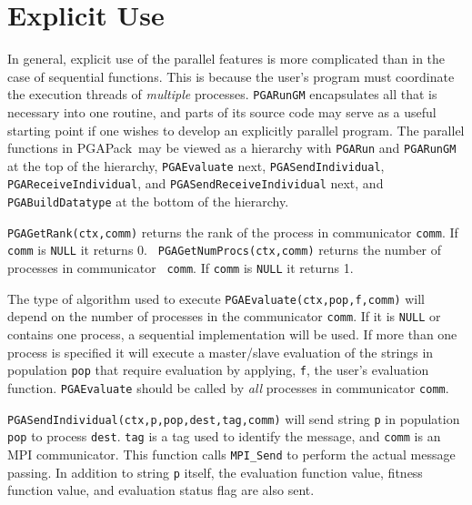 \documentclass{report}
\newcommand{\pga}{PGAPack}
\begin{document}
\section{Explicit Use}\label{sec:par-explicit-usage}

In general, explicit use of the parallel features is more complicated than in
the case of sequential functions.  This is because the user's program must
coordinate the execution threads of {\em multiple} processes.  {\tt PGARunGM}
encapsulates all that is necessary into one routine, and parts of its source
code may serve as a useful starting point if one wishes to develop an
explicitly parallel program.  The parallel functions in \pga\ may be viewed as
a hierarchy with {\tt PGARun} and {\tt PGARunGM} at the top of the hierarchy,
{\tt PGAEvaluate} next, {\tt PGASendIndividual}, {\tt PGAReceiveIndividual},
and {\tt PGASendReceiveIndividual} next, and {\tt PGABuildDatatype} at the
bottom of the hierarchy.

{\tt PGAGetRank(ctx,comm)} returns the rank of the process in communicator
{\tt comm}.  If {\tt comm} is {\tt NULL} it returns 0. {\tt
PGAGetNumProcs(ctx,comm)} returns the number of processes in communicator {\tt
comm}.  If {\tt comm} is {\tt NULL} it returns 1.

The type of algorithm used to execute {\tt PGAEvaluate(ctx,pop,f,comm)} will
depend on the number of processes in the communicator {\tt comm}.  If it is
{\tt NULL} or contains one process, a sequential implementation will be used.
If more than one process is specified it will execute a master/slave
evaluation of the strings in population {\tt pop} that require evaluation by
applying, {\tt f}, the user's evaluation function.  {\tt PGAEvaluate} should
be called by {\em all} processes in communicator {\tt comm}.

{\tt PGASendIndividual(ctx,p,pop,dest,tag,comm)} will send string {\tt p} in
population {\tt pop} to process {\tt dest}.  {\tt tag} is a tag used to
identify the message, and {\tt comm} is an MPI communicator. This function
calls {\tt MPI\_Send} to perform the actual message passing.  In addition to
string {\tt p} itself, the evaluation function value, fitness function value,
and evaluation status flag are also sent.
 
\end{document}
